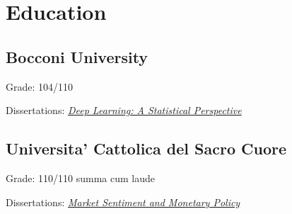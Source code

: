 \documentclass[]{deedy-resume-reversed}
\begin{document}
\begin{minipage}[t]{0.60\textwidth}

% 
% 

%
%

\end{minipage}
\hfill
\begin{minipage}[t]{0.33\textwidth}


\section{Education}

\subsection{Bocconi University}
\vspace{\topsep}
\begin{tightemize}
\item Grade: 104/110
\item Dissertations:  \href{https://drive.google.com/file/d/1ghVGjHLF-3TWeLRvPGTQDK4CHJFv4mxt/view?usp=sharing}{\it Deep Learning: A Statistical Perspective}
\end{tightemize}
\sectionsep

\subsection{Universita' Cattolica del Sacro Cuore}
\begin{tightemize}
\item Grade: 110/110 summa cum laude
\item Dissertations:  \href{https://drive.google.com/file/d/0B3_3DE5m8SV5R3F4LThXS052SDA/view}{\it Market Sentiment and Monetary Policy}
\end{tightemize}
\sectionsep


\end{minipage}
\end{document}

